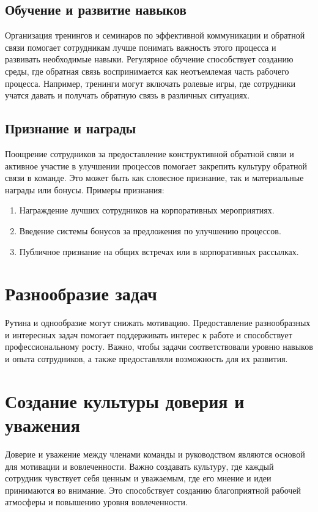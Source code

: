     \subsection*{Обучение и развитие навыков}
    Организация тренингов и семинаров по эффективной коммуникации и обратной связи помогает сотрудникам лучше понимать важность этого процесса и развивать необходимые навыки. Регулярное обучение способствует созданию среды, где обратная связь воспринимается как неотъемлемая часть рабочего процесса. Например, тренинги могут включать ролевые игры, где сотрудники учатся давать и получать обратную связь в различных ситуациях.

    \subsection*{Признание и награды}
    Поощрение сотрудников за предоставление конструктивной обратной связи и активное участие в улучшении процессов помогает закрепить культуру обратной связи в команде. Это может быть как словесное признание, так и материальные награды или бонусы. Примеры признания:
    
    \begin{enumerate}
        \item Награждение лучших сотрудников на корпоративных мероприятиях.
        \item Введение системы бонусов за предложения по улучшению процессов.
        \item Публичное признание на общих встречах или в корпоративных рассылках.
    \end{enumerate}

    \section{Разнообразие задач}
    Рутина и однообразие могут снижать мотивацию. Предоставление разнообразных и интересных задач помогает поддерживать интерес к работе и способствует профессиональному росту. Важно, чтобы задачи соответствовали уровню навыков и опыта сотрудников, а также предоставляли возможность для их развития.

    \section{Создание культуры доверия и уважения}
    Доверие и уважение между членами команды и руководством являются основой для мотивации и вовлеченности. Важно создавать культуру, где каждый сотрудник чувствует себя ценным и уважаемым, где его мнение и идеи принимаются во внимание. Это способствует созданию благоприятной рабочей атмосферы и повышению уровня вовлеченности.

